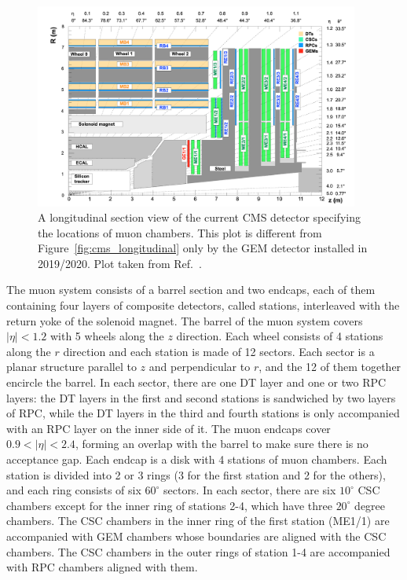 \begin{figure}[!htb]
    \centering
    \includegraphics[width=0.95\textwidth]{pics/LHC_CMS/muon_chambers.png}
    \caption{A longitudinal section view of the current CMS detector specifying the locations of muon chambers.
             This plot is different from Figure~\ref{fig:cms_longitudinal} only by the GEM detector installed in 2019/2020.
             Plot taken from Ref.~\cite{Colaleo:2021453}.}
    \label{fig:cms_muons}
\end{figure}


The muon system consists of a barrel section and two endcaps, each of them containing four layers of composite detectors, 
called stations, interleaved with the return yoke of the solenoid magnet.
The barrel of the muon system covers $|\eta| < 1.2$ with 5 wheels along the $z$ direction.
Each wheel consists of 4 stations along the $r$ direction and each station is made of 12 sectors.
Each sector is a planar structure parallel to $z$ and perpendicular to $r$, 
and the 12 of them together encircle the barrel.
In each sector, there are one DT layer and one or two RPC layers: the DT layers in the first and second stations is sandwiched by two layers of RPC,
while the DT layers in the third and fourth stations is only accompanied with an RPC layer on the inner side of it.
The muon endcaps cover $0.9 < |\eta| < 2.4$, forming an overlap with the barrel to make sure there is no acceptance gap.
Each endcap is a disk with 4 stations of muon chambers.
Each station is divided into 2 or 3 rings (3 for the first station and 2 for the others), and each ring consists of six $60^\circ$ sectors.
In each sector, there are six $10^\circ$ CSC chambers except for the inner ring of stations 2-4, which have three $20^\circ$ degree chambers.
The CSC chambers in the inner ring of the first station (ME1/1) are accompanied with GEM chambers whose boundaries are aligned with the CSC chambers.
The CSC chambers in the outer rings of station 1-4 are accompanied with RPC chambers aligned with them.

